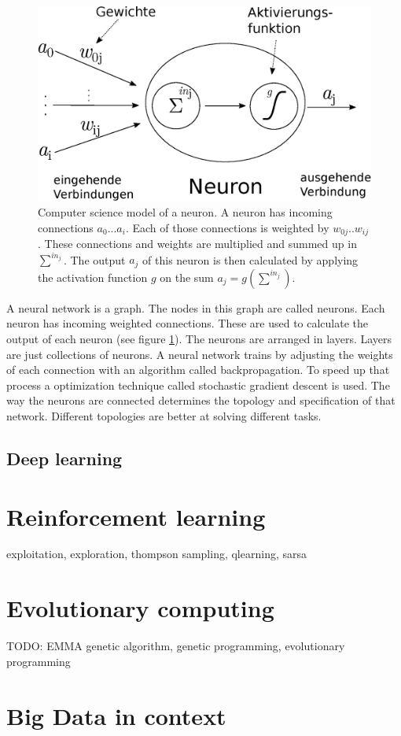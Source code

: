 \documentclass[jou,apacite]{apa6}
\begin{document}
\begin{figure}[!htb]
\centering
\includegraphics[width=.3\textwidth]{neuron.eps}
\caption[Computer science neuron abstraction]{Computer science model of a neuron. A neuron has incoming connections $a_0 ... a_i$. Each of those connections is weighted by $w_{0j} .. w_{ij}$. These connections and weights are multiplied and summed up in $\sum^{in_j}$. The output $a_j$ of this neuron is then calculated by applying the activation function $g$ on the sum $a_j = g(\sum^{in_j})$.}
\label{fig:neuron}
\end{figure}

A neural network is a graph. The nodes in this graph are called neurons. Each neuron has incoming weighted connections. These are used to calculate the output of each neuron (see figure \ref{fig:neuron}). The neurons are arranged in layers. Layers are just collections of neurons. A neural network trains by adjusting the weights of each connection with an algorithm called backpropagation. To speed up that process a optimization technique called stochastic gradient descent is used. The way the neurons are connected determines the topology and specification of that network. Different topologies are better at solving different tasks.

\subsection{Deep learning}

\section{Reinforcement learning}
exploitation, exploration, thompson sampling, qlearning, sarsa

\section{Evolutionary computing}
TODO: EMMA
genetic algorithm, genetic programming, evolutionary programming

\section{Big Data in context}
\end{document}
